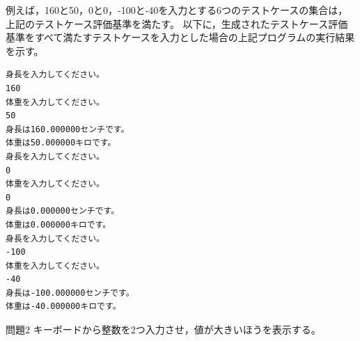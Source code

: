 \documentclass{tpu-sotu}
\begin{document}
例えば，160と50，0と0，-100と-40を入力とする6つのテストケースの集合は，上記のテストケース評価基準を満たす。
以下に，生成されたテストケース評価基準をすべて満たすテストケースを入力とした場合の上記プログラムの実行結果を示す。
\begin{lstlisting}[xleftmargin=1cm]
身長を入力してください。
160
体重を入力してください。
50
身長は160.000000センチです。
体重は50.000000キロです。
身長を入力してください。
0
体重を入力してください。
0
身長は0.000000センチです。
体重は0.000000キロです。
身長を入力してください。
-100
体重を入力してください。
-40
身長は-100.000000センチです。
体重は-40.000000キロです。
\end{lstlisting}
\begin{itembox}[l]{問題2}
キーボードから整数を2つ入力させ，値が大きいほうを表示する。
\end{itembox}
\end{document}
